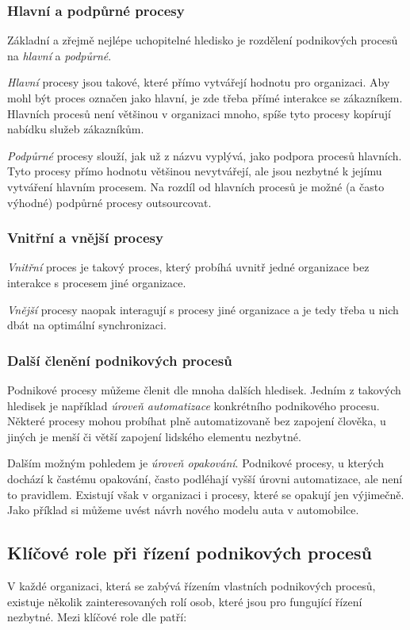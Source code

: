 \subsubsection{Hlavní a podpůrné procesy}
Základní a zřejmě nejlépe uchopitelné hledisko je rozdělení podnikových procesů na \textit{hlavní} a \textit{podpůrné}.

\textit{Hlavní} procesy jsou takové, které přímo vytvářejí hodnotu pro organizaci. Aby mohl být proces označen jako hlavní, je zde třeba přímé interakce se zákazníkem. Hlavních procesů není většinou v organizaci mnoho, spíše tyto procesy kopírují nabídku služeb zákazníkům.

\textit{Podpůrné} procesy slouží, jak už z názvu vyplývá, jako podpora procesů hlavních. Tyto procesy přímo hodnotu většinou nevytvářejí, ale jsou nezbytné k jejímu vytváření hlavním procesem. Na rozdíl od hlavních procesů je možné (a často výhodné) podpůrné procesy outsourcovat.

\subsubsection{Vnitřní a vnější procesy}
\textit{Vnitřní} proces je takový proces, který probíhá uvnitř jedné organizace bez interakce s procesem jiné organizace.

\textit{Vnější} procesy naopak interagují s procesy jiné organizace a je tedy třeba u nich dbát na optimální synchronizaci.

\subsubsection{Další členění podnikových procesů}
Podnikové procesy můžeme členit dle mnoha dalších hledisek. Jedním z takových hledisek je například \textit{úroveň automatizace} konkrétního podnikového procesu. Některé procesy mohou probíhat plně automatizovaně bez zapojení člověka, u jiných je menší či větší zapojení lidského elementu nezbytné.

Dalším možným pohledem je \textit{úroveň opakování}. Podnikové procesy, u kterých dochází k častému opakování, často podléhají vyšší úrovni automatizace, ale není to pravidlem. Existují však v organizaci i procesy, které se opakují jen výjimečně. Jako příklad si můžeme uvést návrh nového modelu auta v automobilce.

\subsection{Klíčové role při řízení podnikových procesů}
V každé organizaci, která se zabývá řízením vlastních podnikových procesů, existuje několik zainteresovaných rolí osob, které jsou pro fungující řízení nezbytné. Mezi klíčové role dle \cite{Weske2007} patří: 

